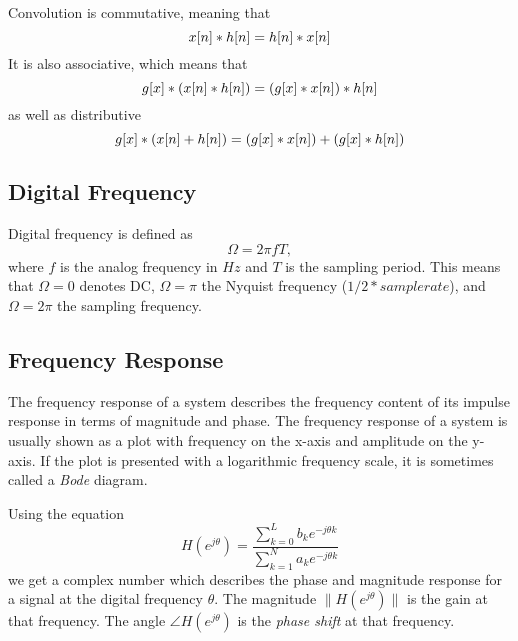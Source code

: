 \documentclass[11pt]{article}
\let\originalleft\left
\let\originalright\right
\renewcommand{\left}{\mathopen{}\mathclose\bgroup\originalleft}
\renewcommand{\right}{\aftergroup\egroup\originalright}
\def\lsqb{\left[}
\def\rsqb{\right]}
\def\sqb#1{\lsqb #1 \rsqb}
\def\xsig{x\sqb{n}}
\begin{document}
Convolution is commutative, meaning that
\begin{equation}
    \xsig * h\sqb{n} = h\sqb{n} * \xsig
\end{equation}
It is also associative, which means that
\begin{equation}
    g\sqb{x} * (\xsig * h\sqb{n}) = (g\sqb{x} * \xsig) * h\sqb{n}
\end{equation}
as well as distributive
\begin{equation}
    g\sqb{x} * (\xsig + h\sqb{n}) = (g\sqb{x} * \xsig) + (g\sqb{x} *  h\sqb{n})
\end{equation}

\subsection{Digital Frequency}
Digital frequency is defined as
\begin{equation}
    \Omega = 2\pi f T,
\end{equation}
where $f$ is the analog frequency in $Hz$ and $T$ is the sampling period. This means that $\Omega=0$ denotes DC, $\Omega=\pi$ the Nyquist frequency ($1/2 * samplerate$), and $\Omega=2\pi$ the sampling frequency.

\subsection{Frequency Response}
The frequency response of a system describes the frequency content of its impulse response in terms of magnitude and phase. The frequency response of a system is usually shown as a plot with frequency on the x-axis and amplitude on the y-axis. If the plot is presented with a logarithmic frequency scale, it is sometimes called a \textit{Bode} diagram.

Using the equation
\def\hfun{H(e^{j\theta})}
\begin{equation}
    \hfun = \frac{\sum_{k=0}^{L} b_k e^{-j\theta k}}{\sum_{k=1}^{N} a_k e^{-j\theta k}}
\end{equation}
we get a complex number which describes the phase and magnitude response for a signal at the digital frequency $\theta$. The magnitude $\|\hfun\|$ is the gain at that frequency. The angle $\angle \hfun$ is the \textit{phase shift} at that frequency.
\end{document}
